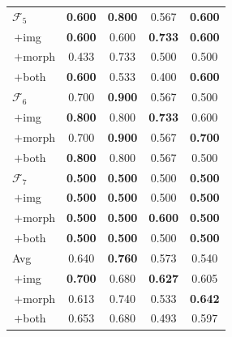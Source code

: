 \documentclass[pdflatex,sn-nature]{sn-jnl}
\begin{document}
\begin{table}[p]
\begin{tabular}{@{}l cccc@{}}
\addlinespace[0.3pt]
$\mathcal{F}_5$      & \textbf{0.600} & \textbf{0.800} & 0.567 & \textbf{0.600} \\
\;\,$+$img           & \textbf{0.600} & 0.600 & \textbf{0.733} & \textbf{0.600} \\
\;\,$+$morph         & 0.433 & 0.733 & 0.500 & 0.500 \\
\;\,$+$both          & \textbf{0.600} & 0.533 & 0.400 & \textbf{0.600} \\
\addlinespace[0.3pt]
$\mathcal{F}_6$      & 0.700 & \textbf{0.900} & 0.567 & 0.500 \\
\;\,$+$img           & \textbf{0.800} & 0.800 & \textbf{0.733} & 0.600 \\
\;\,$+$morph         & 0.700 & \textbf{0.900} & 0.567 & \textbf{0.700} \\
\;\,$+$both          & \textbf{0.800} & 0.800 & 0.567 & 0.500 \\
\addlinespace[0.3pt]
$\mathcal{F}_7$      & \textbf{0.500} & \textbf{0.500} & 0.500 & \textbf{0.500} \\
\;\,$+$img           & \textbf{0.500} & \textbf{0.500} & 0.500 & \textbf{0.500} \\
\;\,$+$morph         & \textbf{0.500} & \textbf{0.500} & \textbf{0.600} & \textbf{0.500} \\
\;\,$+$both          & \textbf{0.500} & \textbf{0.500} & 0.500 & \textbf{0.500} \\
\addlinespace[2pt]
Avg & 0.640 & \textbf{0.760} & 0.573 & 0.540 \\
\;\,$+$img & \textbf{0.700} & 0.680 & \textbf{0.627} & 0.605 \\
\;\,$+$morph & 0.613 & 0.740 & 0.533 & \textbf{0.642} \\
\;\,$+$both & 0.653 & 0.680 & 0.493 & 0.597 \\
\bottomrule
\end{tabular}
\end{table}
\end{document}
